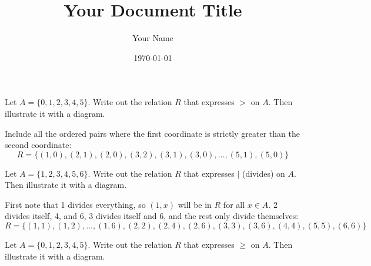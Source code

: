 \documentclass{article}
\title{Your Document Title}
\author{Your Name}
\date{\today} %
\begin{document}
\maketitle

\begin{problem}
Let $A = \{0, 1, 2, 3, 4, 5\}$. Write out the relation $R$ that expresses $ > $ on $A$. Then illustrate it with a diagram.
\end{problem}

Include all the ordered pairs where the first coordinate is strictly greater than the second coordinate:
$$R = \{(1, 0), (2, 1), (2, 0), (3, 2), (3, 1), (3, 0), \ldots , (5, 1), (5, 0)\}$$

\begin{problem}
Let $A = \{1, 2, 3, 4, 5, 6\}$. Write out the relation $R$ that expresses $\mid$ (divides) on $A$. Then illustrate it with a diagram.
\end{problem}

First note that 1 divides everything, so $(1, x)$ will be in $R$ for all $x \in A$. 2 divides itself, 4, and 6, 3 divides itself and 6, and the rest only divide themselves:
$$R = \{(1, 1), (1, 2), \ldots, (1, 6), (2, 2), (2, 4), (2, 6), (3, 3), (3, 6), (4, 4), (5, 5), (6, 6)\}$$

\begin{problem}
Let $A = \{0, 1, 2, 3, 4, 5\}$. Write out the relation $R$ that expresses $\geq$ on $A$. Then illustrate it with a diagram.
\end{problem}
\end{document}
